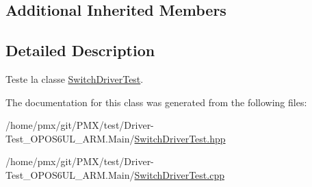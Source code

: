 \subsection*{Additional Inherited Members}


\subsection{Detailed Description}
Teste la classe \hyperlink{classtest_1_1SwitchDriverTest}{Switch\+Driver\+Test}. 

The documentation for this class was generated from the following files\+:\begin{DoxyCompactItemize}
\item 
/home/pmx/git/\+P\+M\+X/test/\+Driver-\/\+Test\+\_\+\+O\+P\+O\+S6\+U\+L\+\_\+\+A\+R\+M.\+Main/\hyperlink{SwitchDriverTest_8hpp}{Switch\+Driver\+Test.\+hpp}\item 
/home/pmx/git/\+P\+M\+X/test/\+Driver-\/\+Test\+\_\+\+O\+P\+O\+S6\+U\+L\+\_\+\+A\+R\+M.\+Main/\hyperlink{SwitchDriverTest_8cpp}{Switch\+Driver\+Test.\+cpp}\end{DoxyCompactItemize}
